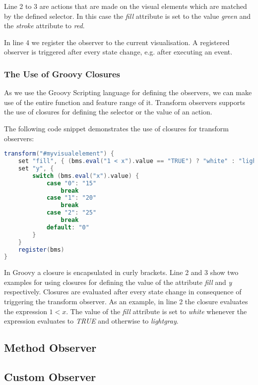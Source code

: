 Line 2 to 3 are actions that are made on the visual elements which are matched by the defined selector.
In this case the \textit{fill} attribute is set to the value \textit{green} and the \textit{stroke} attribute to \textit{red}.

In line 4 we register the observer to the current visualisation.
A registered observer is triggered after every state change, e.g. after executing an event.

\subsubsection{The Use of Groovy Closures}

As we use the Groovy Scripting language for defining the observers, we can make use of the entire function and feature range of it.
Transform observers supports the use of closures for defining the selector or the value of an action.

The following code snippet demonstrates the use of closures for transform observers:

\begin{lstlisting}[float=ht,language=Groovy]
transform("#myvisualelement") {
    set "fill", { (bms.eval("1 < x").value == "TRUE") ? "white" : "lightgray" }
    set "y", {
        switch (bms.eval("x").value) {
            case "0": "15"
                break
            case "1": "20"
                break
            case "2": "25"
                break
            default: "0"
        }
    }
    register(bms)
}
\end{lstlisting}

In Groovy a closure is encapsulated in curly brackets.
Line 2 and 3 show two examples for using closures for defining the value of the attribute \textit{fill} and \textit{y} respectively.
Closures are evaluated after every state change in consequence of triggering the transform observer.
As an example, in line 2 the closure evaluates the expression $1 < x$.
The value of the \textit{fill} attribute is set to \textit{white} whenever the expression evaluates to \textit{TRUE} and otherwise to \textit{lightgray}.


\subsection{Method Observer}
\label{sec:method_observer}

\subsection{Custom Observer}
\label{sec:custom_observers}